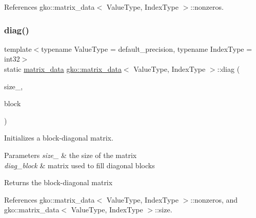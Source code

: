 References gko\+::matrix\+\_\+data$<$ Value\+Type, Index\+Type $>$\+::nonzeros.

\mbox{\label{structgko_1_1matrix__data_a2d2fb8725ef69679a74f7bd2f627e776}} 
\subsubsection{\texorpdfstring{diag()}{diag()}\hspace{0.1cm}{\footnotesize\ttfamily [3/5]}}
{\footnotesize\ttfamily template$<$typename Value\+Type = default\+\_\+precision, typename Index\+Type = int32$>$ \\
static \hyperlink{structgko_1_1matrix__data}{matrix\+\_\+data} \hyperlink{structgko_1_1matrix__data}{gko\+::matrix\+\_\+data}$<$ Value\+Type, Index\+Type $>$\+::diag (\begin{DoxyParamCaption}\item[{\hyperlink{structgko_1_1dim}{dim}$<$ 2 $>$}]{size\+\_\+,  }\item[{const \hyperlink{structgko_1_1matrix__data}{matrix\+\_\+data}$<$ Value\+Type, Index\+Type $>$ \&}]{block }\end{DoxyParamCaption})\hspace{0.3cm}{\ttfamily [static]}}



Initializes a block-\/diagonal matrix. 


\begin{DoxyParams}{Parameters}
{\em size\+\_\+} & the size of the matrix \\
\hline
{\em diag\+\_\+block} & matrix used to fill diagonal blocks\\
\hline
\end{DoxyParams}
\begin{DoxyReturn}{Returns}
the block-\/diagonal matrix 
\end{DoxyReturn}


References gko\+::matrix\+\_\+data$<$ Value\+Type, Index\+Type $>$\+::nonzeros, and gko\+::matrix\+\_\+data$<$ Value\+Type, Index\+Type $>$\+::size.

\mbox{\label{structgko_1_1matrix__data_a83d309b12caf3957c116ed1133da39a7}} 
